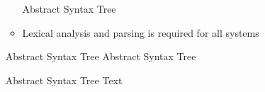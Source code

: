 \begin{itemize}
\begin{itemize}
\begin{itemize}
\begin{itemize}
                        \end{itemize}
                \end{itemize}
             Abstract Syntax Tree
            \item Lexical analysis and parsing is required for all systems
        \end{itemize}
        \begin{itemize}
             Abstract Syntax Tree
             Abstract Syntax Tree
        \end{itemize}
        \begin{itemize}
             Abstract Syntax Tree
             Text
        \end{itemize}
\end{itemize}

